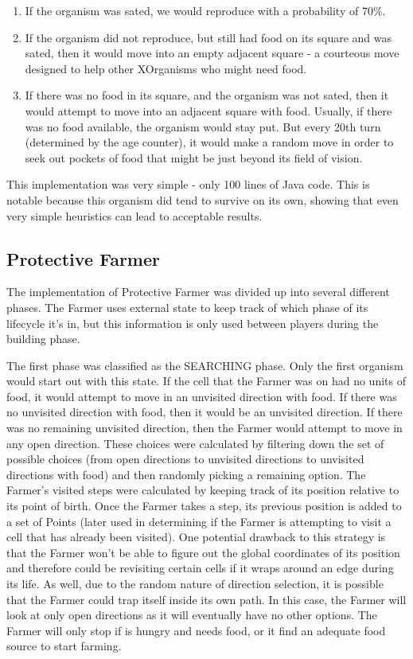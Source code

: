 \documentclass[
10pt, %
letterpaper, %
oneside, %
headinclude,footinclude, %
english
]{article}
\begin{document}
\begin{enumerate}
  \item If the organism was sated, we would reproduce with a probability of 70\%.
  \item If the organism did not reproduce, but still had food on its square and was sated, then it would move into an empty adjacent square - a courteous move designed to help other XOrganisms who might need food.
  \item If there was no food in its square, and the organism was not sated, then it would attempt to move into an adjacent square with food. Usually, if there was no food available, the organism would stay put. But every 20th turn (determined by the age counter), it would make a random move in order to seek out pockets of food that might be just beyond its field of vision.
\end{enumerate}

This implementation was very simple - only 100 lines of Java code. This is notable because this organism did tend to survive on its own, showing that even very simple heuristics can lead to acceptable results.

\subsection{Protective Farmer}
The implementation of Protective Farmer was divided up into several different phases. The Farmer uses external state to keep track of which phase of its lifecycle it's in, but this information is only used between players during the building phase.

The first phase was classified as the SEARCHING phase. Only the first organism would start out with this state. If the cell that the Farmer was on had no units of food, it would attempt to move in an unvisited direction with food. If there was no unvisited direction with food, then it would be an unvisited direction. If there was no remaining unvisited direction, then the Farmer would attempt to move in any open direction. These choices were calculated by filtering down the set of possible choices (from open directions to unvisited directions to unvisited directions with food) and then randomly picking a remaining option. The Farmer's visited steps were calculated by keeping track of its position relative to its point of birth. Once the Farmer takes a step, its previous position is added to a set of Points (later used in determining if the Farmer is attempting to visit a cell that has already been visited). One potential drawback to this strategy is that the Farmer won't be able to figure out the global coordinates of its position and therefore could be revisiting certain cells if it wraps around an edge during its life. As well, due to the random nature of direction selection, it is possible that the Farmer could trap itself inside its own path. In this case, the Farmer will look at only open directions as it will eventually have no other options. The Farmer will only stop if is hungry and needs food, or it find an adequate food source to start farming.
\end{document}
